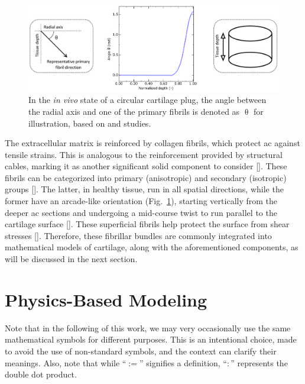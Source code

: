 \documentclass[12pt,a4paper]{report}
\begin{document}
\begin{figure}
\centering
\includegraphics[width=0.9\linewidth]{arcade.jpg}
\caption{In the \emph{in vivo} state of a circular cartilage plug, the angle between the radial axis and one of the primary fibrils is denoted as 
$\uptheta$ for illustration, based on \cite{benninghoff1925} and \cite{wilson2004a} studies.
\label{arcade}}
\end{figure}
%
The extracellular matrix is reinforced by collagen fibrils, which protect \ac{ac} against tensile strains. This is analogous to the reinforcement provided by structural cables, marking it as another significant solid component to consider [\cite{laurent2007,bielajew2020}]. These fibrils can be categorized into primary (anisotropic) and secondary (isotropic) groups [\cite{clark1985,wilson2004a}]. The latter, in healthy tissue, run in all spatial directions, while the former have an arcade-like orientation (Fig.~\ref{arcade}), starting vertically from the deeper \ac{ac} sections and undergoing a mid-course twist to run parallel to the cartilage surface [\cite{wilson2004a}]. These superficial fibrils help protect the surface from shear stresses [\cite{shirazi2008,motavalli2014}]. Therefore, these fibrillar bundles are commonly integrated into mathematical models of cartilage, along with the aforementioned components, as will be discussed in the next section.

\section{Physics-Based Modeling}
%
Note that in the following of this work, we may very occasionally use the same mathematical symbols for different purposes. This is an intentional choice, made to avoid the use of non-standard symbols, and the context can clarify their meanings. Also, note that while ``$:=$'' signifies a definition, ``$:$'' represents the double dot product.
\end{document}
